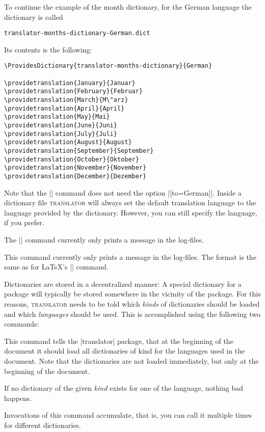 To continue the example of the month dictionary, for the German language the dictionary is called
\begin{verbatim}
translator-months-dictionary-German.dict
\end{verbatim}
Its contents is the following:
\begin{verbatim}
\ProvidesDictionary{translator-months-dictionary}{German}

\providetranslation{January}{Januar}
\providetranslation{February}{Februar}
\providetranslation{March}{M\"arz}
\providetranslation{April}{April}
\providetranslation{May}{Mai}
\providetranslation{June}{Juni}
\providetranslation{July}{Juli}
\providetranslation{August}{August}
\providetranslation{September}{September}
\providetranslation{October}{Oktober}
\providetranslation{November}{November}
\providetranslation{December}{Dezember}
\end{verbatim}
Note that the |\providetranslation| command does not need the option |[to=German]|. Inside a dictionary file \textsc{translator} will always set the default translation language to the language provided by the dictionary. However, you can still specify the language, if you prefer.

The |\ProvidesDictionary| command currently only prints a message in the log-files.

\begin{command}{\ProvidesDictionary{}}
  This command currently only prints a message in the log-files. The format is the same as for \LaTeX's |\ProvidesPackage| command.
\end{command}

Dictionaries are stored in a decentralized manner: A special dictionary for a package will typically be stored somewhere in the vicinity of the package. For this reasons, \textsc{translator} needs to be told which \emph{kinds} of dictionaries should be loaded and which \emph{languages}  should be used. This is accomplished using the following two commands:

\begin{command}{\usedictionary{}}
  This command tells the |translator| package, that at the beginning of the document it should load all dictionaries of kind  for the languages used in the document. Note that the dictionaries are not loaded immediately, but only at the beginning of the document.

  If no dictionary of the given \emph{kind} exists for one of the language, nothing bad happens.

  Invocations of this command accumulate, that is, you can call it multiple times for different dictionaries.
\end{command}

